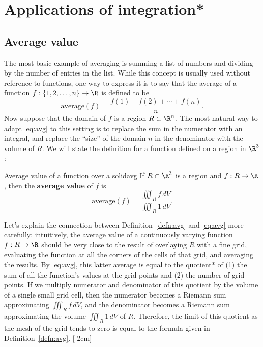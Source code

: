 \documentclass{watsonbook}
\begin{document}
\section{Applications of integration*} \label{sec:applications}

\subsection{Average value}

The most basic example of averaging is summing a list of numbers and
dividing by the number of entries in the list. While this concept is
usually used without reference to functions, one way to express it is
to say that the average of a function
$f:\{1,2,\ldots,n\} \rightarrow \R$ is defined to be
\begin{equation} \label{eq:avg} 
  \mathrm{average}(f) = \frac{f(1) + f(2) + \cdots + f(n)}{n}. 
\end{equation}
Now suppose that the domain of $f$ is a region $R\subset \R^n$. The
most natural way to adapt \eqref{eq:avg} to this setting is to replace
the sum in the numerator with an integral, and replace the ``size'' of
the domain $n$ in the denominator with the volume of $R$. We will
state the definition for a function defined on a region in $\R^3$:

\begin{defn}{Average value of a function over a solid}{avg}
  If $R\subset \R^3$ is a region and $f: R \to \R$, then the \textbf{average value} of $f$ is
  \[
    \mathrm{average}(f) = \frac{\displaystyle{\iiint_R f \,
        dV}}{\displaystyle{\iiint_R 1 \, dV}}.
  \]
\end{defn}

Let's explain the connection between Definition~\ref{defn:avg} and
\eqref{eq:avg} more carefully: intuitively, the average value of a
continuously varying function $f:R\to \R$ should be very close to the
result of overlaying $R$ with a fine grid, evaluating the function at
all the corners of the cells of that grid, and averaging the
results. By \eqref{eq:avg}, this latter average is equal to the
quotient* of (1) the sum of all the function's values at the grid
points and (2) the number of grid points. If we multiply numerator and
denominator of this quotient by the volume of a single small grid
cell, then the numerator becomes a Riemann sum approximating
$\iiint_R f \, dV$, and the denominator becomes a Riemann sum
approximating the volume $\iiint_R 1 \, dV$ of $R$. Therefore, the
limit of this quotient as the mesh of the grid tends to zero is equal
to the formula given in Definition~\ref{defn:avg}. [-2cm]
\end{document}
